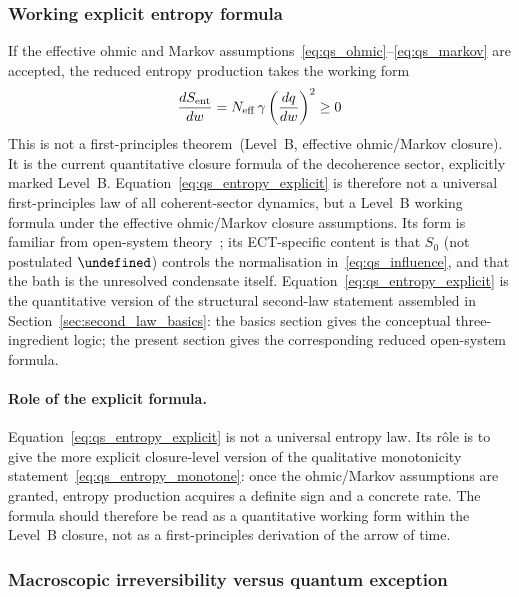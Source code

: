 \documentclass[11pt,a4paper]{article}
\let\hbar\undefined
\numberwithin{equation}{section}
\begin{document}
\subsubsection*{Working explicit entropy formula}

If the effective ohmic and Markov
assumptions~\eqref{eq:qs_ohmic}--\eqref{eq:qs_markov} are accepted,
the reduced entropy production takes the working form
\begin{equation}
  \label{eq:qs_entropy_explicit}
  \frac{dS_{\rm ent}}{dw}
  =
  N_{\rm eff}\,\gamma
  \left(\frac{dq}{dw}\right)^2
  \ge 0
\end{equation}
This is not a first-principles theorem~(Level~B, effective ohmic/Markov closure).
It is the current quantitative closure formula of the decoherence
sector, explicitly marked Level~B.
Equation~\eqref{eq:qs_entropy_explicit} is therefore not a universal
first-principles law of all coherent-sector dynamics, but a Level~B
working formula under the effective ohmic/Markov closure assumptions.
Its form is familiar from open-system theory~\cite{CaldeiraLeggett1983}; its
ECT-specific content is that $S_0$ (not postulated $\hbar$) controls
the normalisation in~\eqref{eq:qs_influence}, and that the bath
is the unresolved condensate itself.
Equation~\eqref{eq:qs_entropy_explicit} is the quantitative version
of the structural second-law statement assembled in
Section~\ref{sec:second_law_basics}: the basics section gives the
conceptual three-ingredient logic; the present section gives the
corresponding reduced open-system formula.

\paragraph{Role of the explicit formula.}
Equation~\eqref{eq:qs_entropy_explicit} is not a universal entropy law.
Its rôle is to give the more explicit closure-level version of the
qualitative monotonicity statement~\eqref{eq:qs_entropy_monotone}:
once the ohmic/Markov assumptions are granted, entropy production
acquires a definite sign and a concrete rate.
The formula should therefore be read as a quantitative working form
within the Level~B closure, not as a first-principles derivation of
the arrow of time.

\subsubsection*{Macroscopic irreversibility versus quantum exception}
\end{document}
